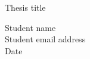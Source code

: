 \clearpage
\thispagestyle{empty}


\vspace*{\fill}
\begin{center}
    \Huge Thesis title \\

    \vspace{2cm}

    \normalsize Student name \\
    \normalsize Student email address \\

    \vspace{1cm}
    \normalsize Date\\
\end{center}

\vspace*{\fill}